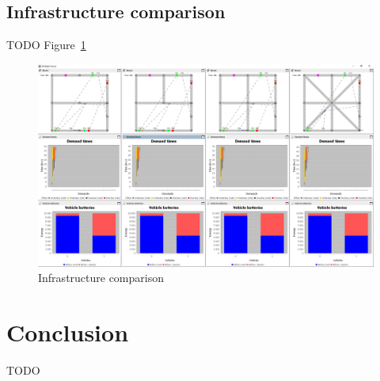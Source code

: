 \documentclass{article}
\begin{document}
    \subsection{Infrastructure comparison}
    \label{sec:infrastructure-comparison}
    TODO Figure~\ref{fig:6}

    \begin{figure}[htbp]
        \centering
        \includegraphics[width=\textwidth]{../../screenshots/infrastructure-comparison.png}
        \caption{Infrastructure comparison}
        \label{fig:6}
    \end{figure}

    \section{Conclusion}
    \label{sec:con}
    TODO

    
    
\end{document}
